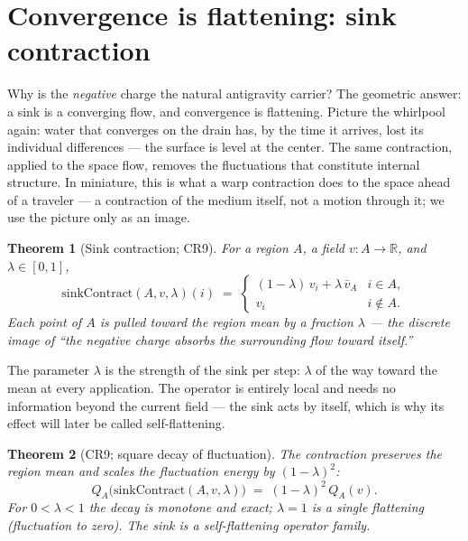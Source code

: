 \documentclass[aps,prd,preprint,superscriptaddress,amsmath,amssymb]{revtex4-2}
\newtheorem{theorem}{Theorem}[section]
\begin{document}
\section{Convergence is flattening: sink contraction}
\label{sec:sink}

Why is the \emph{negative} charge the natural antigravity carrier?
The geometric answer: a sink is a converging flow, and convergence is
flattening.  Picture the whirlpool again: water that converges on the
drain has, by the time it arrives, lost its individual differences ---
the surface is level at the center.  The same contraction, applied to
the space flow, removes the fluctuations that constitute internal
structure.  In miniature, this is what a warp contraction does to the
space ahead of a traveler \cite{alcubierre1994warp} --- a contraction
of the medium itself, not a motion through it; we use the picture only
as an image.

\begin{theorem}[Sink contraction; CR9]
\label{def:sinkcontract}
For a region $A$, a field $v:A\to\mathbb R$, and $\lambda\in[0,1]$,
\[
\text{sinkContract}(A,v,\lambda)(i)
\;=\;\begin{cases}
(1-\lambda)\,v_i+\lambda\,\bar v_A & i\in A,\\
v_i & i\notin A .
\end{cases}
\]
Each point of $A$ is pulled toward the region mean by a fraction
$\lambda$ --- the discrete image of ``the negative charge absorbs the
surrounding flow toward itself.''
\end{theorem}

The parameter $\lambda$ is the strength of the sink per step: $\lambda$
of the way toward the mean at every application.  The operator is
entirely local and needs no information beyond the current field ---
the sink acts by itself, which is why its effect will later be called
self-flattening.

\begin{theorem}[CR9; square decay of fluctuation]
\label{thm:cr9}
The contraction preserves the region mean and scales the fluctuation
energy by $(1-\lambda)^2$:
\begin{equation}
\label{eq:cr9}
Q_A\bigl(\text{sinkContract}(A,v,\lambda)\bigr)
\;=\;(1-\lambda)^2\,Q_A(v).
\end{equation}
For $0<\lambda<1$ the decay is monotone and exact; $\lambda=1$ is a
single flattening (fluctuation to zero).  The sink is a
self-flattening operator family.
\end{theorem}
\end{document}

